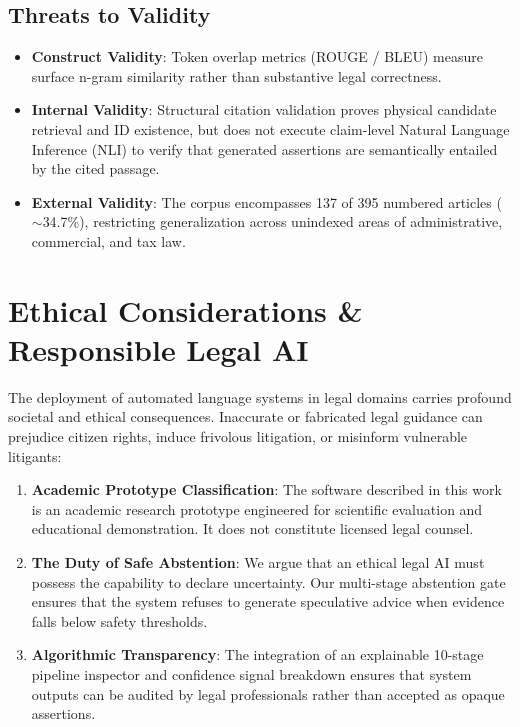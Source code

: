 \documentclass[10pt,twocolumn]{article}
\begin{document}
\subsection{Threats to Validity}
\begin{itemize}[leftmargin=*]
    \item \textbf{Construct Validity}: Token overlap metrics (ROUGE / BLEU) measure surface n-gram similarity rather than substantive legal correctness.
    \item \textbf{Internal Validity}: Structural citation validation proves physical candidate retrieval and ID existence, but does not execute claim-level Natural Language Inference (NLI) to verify that generated assertions are semantically entailed by the cited passage.
    \item \textbf{External Validity}: The corpus encompasses 137 of 395 numbered articles ($\sim$34.7\%), restricting generalization across unindexed areas of administrative, commercial, and tax law.
\end{itemize}

\section{Ethical Considerations \& Responsible Legal AI}
\label{sec:ethics}

The deployment of automated language systems in legal domains carries profound societal and ethical consequences. Inaccurate or fabricated legal guidance can prejudice citizen rights, induce frivolous litigation, or misinform vulnerable litigants:
\begin{enumerate}[leftmargin=*]
    \item \textbf{Academic Prototype Classification}: The software described in this work is an academic research prototype engineered for scientific evaluation and educational demonstration. It does not constitute licensed legal counsel.
    \item \textbf{The Duty of Safe Abstention}: We argue that an ethical legal AI must possess the capability to declare uncertainty. Our multi-stage abstention gate ensures that the system refuses to generate speculative advice when evidence falls below safety thresholds.
    \item \textbf{Algorithmic Transparency}: The integration of an explainable 10-stage pipeline inspector and confidence signal breakdown ensures that system outputs can be audited by legal professionals rather than accepted as opaque assertions.
\end{enumerate}
\end{document}
